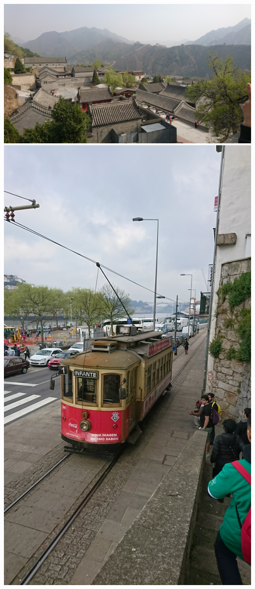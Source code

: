 \documentclass{beamer}
\begin{document}
\begin{frame}
\begin{columns}
  \includegraphics[width=1\textwidth]{icpc/DSC_0171}
  \includegraphics[width=1\textwidth]{icpc/DSC_0677}
\end{columns}


\end{frame}
\end{document}
